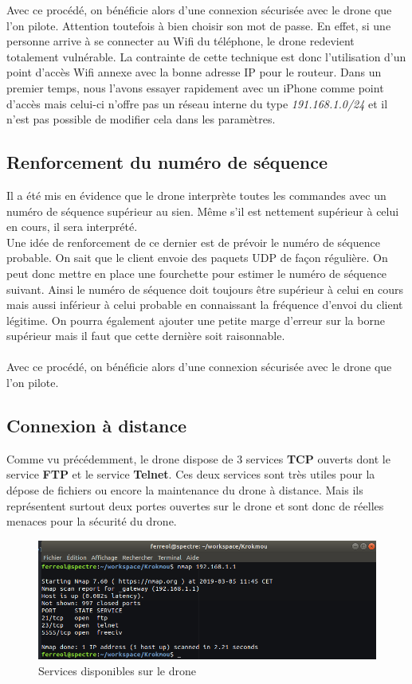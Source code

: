 Avec ce procédé, on bénéficie alors d'une connexion sécurisée avec le drone que l'on pilote. Attention toutefois à bien choisir son mot de passe. En effet, si une personne arrive à se connecter au Wifi du téléphone, le drone redevient totalement vulnérable. La contrainte de cette technique est donc l'utilisation d'un point d'accès Wifi annexe avec la bonne adresse IP pour le routeur. Dans un premier temps, nous l'avons essayer rapidement avec un iPhone comme point d'accès mais celui-ci n'offre pas un réseau interne du type \textit{191.168.1.0/24} et il n'est pas possible de modifier cela dans les paramètres.

\subsection{Renforcement du numéro de séquence}
Il a été mis en évidence que le drone interprète toutes les commandes avec un numéro de séquence supérieur au sien. Même s'il est nettement supérieur à celui en cours, il sera interprété.\\
Une idée de renforcement de ce dernier est de prévoir le numéro de séquence probable. On sait que le client envoie des paquets UDP de façon régulière. On peut donc mettre en place une fourchette pour estimer le numéro de séquence suivant. Ainsi le numéro de séquence doit toujours être supérieur à celui en cours mais aussi inférieur à celui probable en connaissant la fréquence d’envoi du client légitime. On pourra également ajouter une petite marge d'erreur sur la borne supérieur mais il faut que cette dernière soit raisonnable.\\\\
Avec ce procédé, on bénéficie alors d'une connexion sécurisée avec le drone que l'on pilote.

\subsection{Connexion à distance}
Comme vu précédemment, le drone dispose de 3 services \textbf{TCP} ouverts dont le service \textbf{FTP} et le service \textbf{Telnet}. Ces deux services sont très utiles pour la dépose de fichiers ou encore la maintenance du drone à distance. Mais ils représentent surtout deux portes ouvertes sur le drone et sont donc de réelles menaces pour la sécurité du drone.

\begin{figure}[H]
  \centering
  \includegraphics[scale=0.5]{images/scan_drone}
  \caption{Services disponibles sur le drone}
\end{figure}

